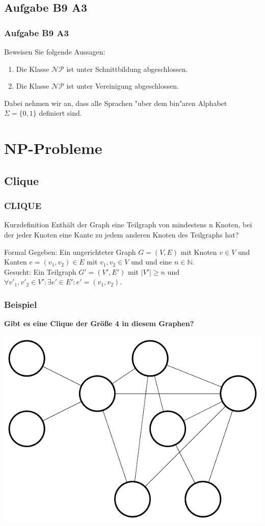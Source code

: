 \subsection{Aufgabe B9 A3}
\begin{frame}
	\frametitle{Aufgabe B9 A3}
	Beweisen Sie folgende Aussagen:
	\begin{enumerate}
	\item Die Klasse $\mathcal{NP}$ ist unter Schnittbildung abgeschlossen.
	\item Die Klasse $\mathcal{NP}$ ist unter Vereinigung abgeschlossen.
	\end{enumerate}
	Dabei nehmen wir an, dass alle Sprachen "uber dem bin"aren Alphabet $\Sigma =
	\{0,1\}$ definiert sind.
\end{frame}

\section{NP-Probleme}
\subsection{Clique}
\begin{frame}
	\frametitle{CLIQUE}
	\begin{block}{Kurzdefinition}
	Enthält der Graph eine Teilgraph von mindestens n Knoten, bei der jeder Knoten eine Kante zu jedem anderen Knoten des Teilgraphs hat?
	\end{block}
	\begin{block}{Formal}
	Gegeben: Ein ungerichteter Graph $G = (V,E)$ mit Knoten $v \in V$ und Kanten $e=(v_1, v_2)\in E$ mit $v_1, v_2 \in V$ und und eine $n \in \mathbb{N}$.\\
	Gesucht: Ein Teilgraph $G' = (V',E')$ mit $|V'|\ge n$ und $\forall v'_1, v'_2\in V':\exists e'\in E': e'=(v_1,v_2)$.
	\end{block}
\end{frame}
\begin{frame}
	\frametitle{Beispiel}
	\textbf{Gibt es eine Clique der Größe 4 in diesem Graphen?}
	\begin{center}
	\includegraphics[scale=0.6]{images/4CLIQUE}	
	\end{center}
\end{frame}
